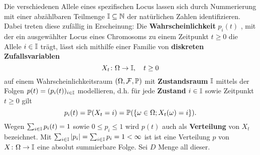 \documentclass[a4paper]{paper}
\numberwithin{equation}{satz}
\begin{document}
\begin{bem}
  \par Die verschiedenen Allele eines spezifischen Locus lassen sich durch Nummerierung mit einer abzählbaren Teilmenge $\mathbb I\subseteq \N$ der natürlichen Zahlen identifizieren. Dabei treten diese zufällig in  Erscheinung: Die \textbf{Wahrscheinlichkeit} $p_i(t)$ , mit der ein ausgewählter Locus eines Chromosoms zu einem Zeitpunkt $t\geq 0$ die Allele $i\in\I$ trägt, lässt sich mithilfe einer Familie von  \textbf{diskreten Zufallsvariablen} $$X_t\colon\Omega\to \I,\quad t\geq0$$ auf einem Wahrscheinlichkeitsraum $(\Omega,\mathcal F, \P)$  mit \textbf{Zustandsraum} $\I$ mittels der Folgen $p(t)=(p_i(t))_{i\in\I}$ modellieren, d.h. für jede \textbf{Zustand} $i\in\I$ sowie Zeitpunkt $t\geq 0$ gilt
  $$p_i(t)=\P(X_t=i)=\P(\{\omega\in \Omega; X_t(\omega)=i\}).$$ Wegen $\sum_{i\in\I}p_i(t)=1$ sowie $0\leq p_i\leq 1$ wird $p(t)$ auch als \textbf{Verteilung} von $X_t$ bezeichnet.  Mit $\sum_{i\in\I}|p_i|=\sum_{i\in\I}p_i=1<\infty$ ist ist eine Verteilung $p$ von $X\colon\Omega\to\I$ eine absolut summierbare Folge. Sei $D$ Menge all dieser.

\end{bem}
\end{document}
